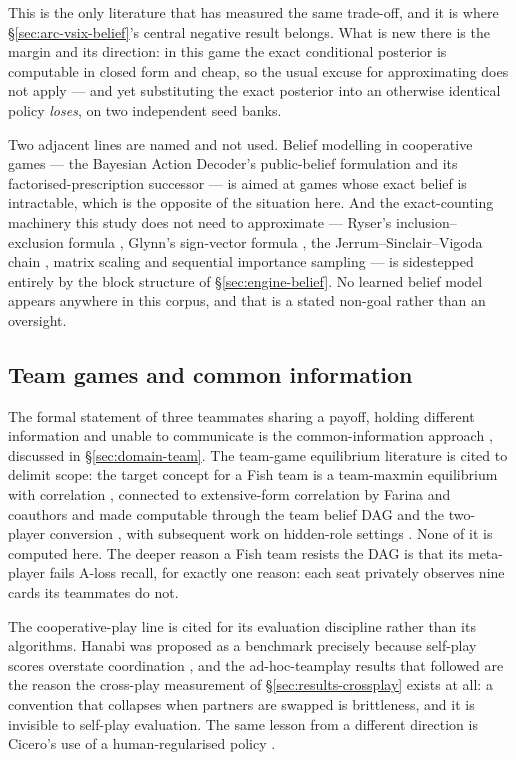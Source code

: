 This is the only literature that has measured the same trade-off, and it is where
\S\ref{sec:arc-vsix-belief}'s central negative result belongs. What is new there is the margin and
its direction: in this game the exact conditional posterior is computable in closed form and cheap,
so the usual excuse for approximating does not apply --- and yet substituting the exact posterior
into an otherwise identical policy \emph{loses}, on two independent seed banks.

Two adjacent lines are named and not used. Belief modelling in cooperative games --- the Bayesian
Action Decoder's public-belief formulation \cite{foerster2019bad} and its factorised-prescription
successor \cite{sokota2021capi} --- is aimed at games whose exact belief is intractable, which is the
opposite of the situation here. And the exact-counting machinery this study does not need to
approximate --- Ryser's inclusion--exclusion formula \cite{ryser}, Glynn's sign-vector formula
\cite{glynn}, the Jerrum--Sinclair--Vigoda chain \cite{jsv}, matrix scaling \cite{lsw} and
sequential importance sampling \cite{chen-sis} --- is sidestepped entirely by the block structure of
\S\ref{sec:engine-belief}. No learned belief model appears anywhere in this corpus, and that is a
stated non-goal rather than an oversight.

\subsection{Team games and common information}
\label{sec:related-team}

The formal statement of three teammates sharing a payoff, holding different information and unable
to communicate is the common-information approach \cite{nayyar2013common}, discussed in
\S\ref{sec:domain-team}. The team-game equilibrium literature is cited to delimit scope: the target
concept for a Fish team is a team-maxmin equilibrium with correlation \cite{celli-gatti}, connected
to extensive-form correlation by Farina and coauthors \cite{farina-collusion} and made computable
through the team belief DAG and the two-player conversion \cite{zhang-tbdag,carminati-tpi}, with
subsequent work on hidden-role settings \cite{carminati2024hiddenrole}. None of it is computed here.
The deeper reason a Fish team resists the DAG is that its meta-player fails A-loss recall, for
exactly one reason: each seat privately observes nine cards its teammates do not.

The cooperative-play line is cited for its evaluation discipline rather than its algorithms. Hanabi
was proposed as a benchmark precisely because self-play scores overstate coordination
\cite{bard-hanabi}, and the ad-hoc-teamplay results that followed
\cite{hu-sad,hu-otherplay,hu2021obl,hu2022sed,cox-hanabi,tian2020jps,jacob2022pikl,hu2022humanregularized,dizdarevic2025ah2ac2}
are the reason the cross-play measurement of \S\ref{sec:results-crossplay} exists at all: a
convention that collapses when partners are swapped is brittleness, and it is invisible to self-play
evaluation. The same lesson from a different direction is Cicero's use of a human-regularised policy
\cite{fair2022cicero}.

